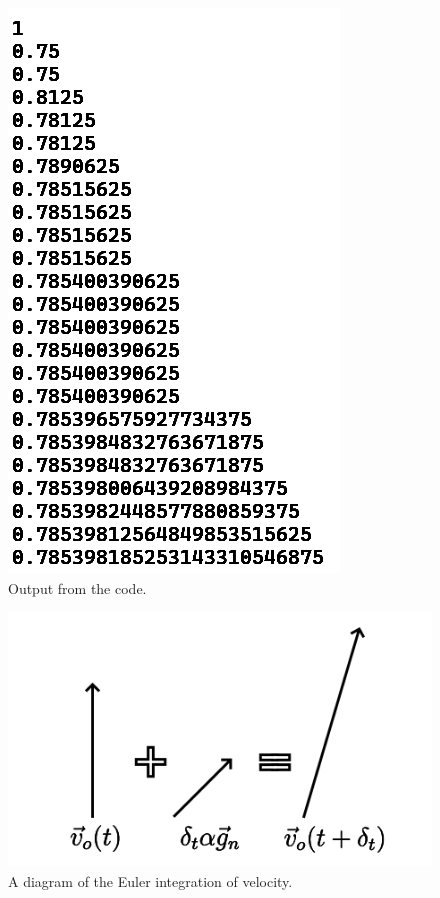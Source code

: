 \documentclass[12pt]{article}
\begin{document}
\begin{figure} 
\centering
\label{fig2}
  \includegraphics[width = 4 in]{code_output.png}
  \caption{
Output from the code.
}
\end{figure}







\begin{figure} 
\centering
\label{fig3}
  \includegraphics[width = 6 in]{velocity.png}
  \caption{
A diagram of the Euler integration of velocity.
}
\end{figure}
\end{document}
